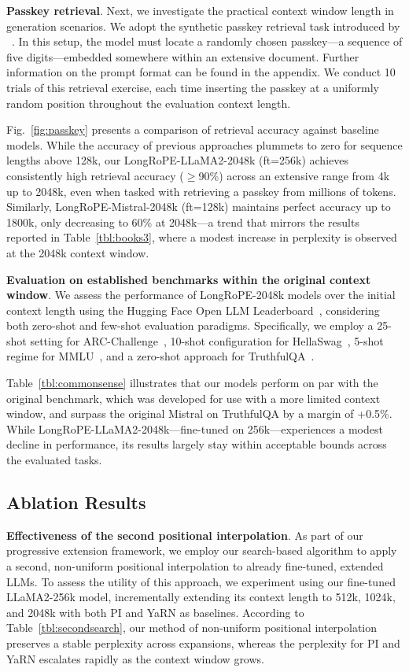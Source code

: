 \textbf{Passkey retrieval}. Next, we investigate the practical context window length in generation scenarios. We adopt the synthetic passkey retrieval task introduced by ~\cite{passkey}. In this setup, the model must locate a randomly chosen passkey—a sequence of five digits—embedded somewhere within an extensive document. Further information on the prompt format can be found in the appendix. We conduct 10 trials of this retrieval exercise, each time inserting the passkey at a uniformly random position throughout the evaluation context length.

Fig.~\ref{fig:passkey} presents a comparison of retrieval accuracy against baseline models. While the accuracy of previous approaches plummets to zero for sequence lengths above 128k, our LongRoPE-LLaMA2-2048k (ft=256k) achieves consistently high retrieval accuracy ($\ge$90\%) across an extensive range from 4k up to 2048k, even when tasked with retrieving a passkey from millions of tokens. Similarly, LongRoPE-Mistral-2048k (ft=128k) maintains perfect accuracy up to 1800k, only decreasing to 60\% at 2048k—a trend that mirrors the results reported in Table~\ref{tbl:books3}, where a modest increase in perplexity is observed at the 2048k context window.

\textbf{Evaluation on established benchmarks within the original context window}. We assess the performance of LongRoPE-2048k models over the initial context length using the Hugging Face Open LLM Leaderboard~\cite{huggingfaceboard}, considering both zero-shot and few-shot evaluation paradigms. Specifically, we employ a 25-shot setting for ARC-Challenge~\cite{allenai:arc}, 10-shot configuration for HellaSwag~\cite{zellers2019hellaswag}, 5-shot regime for MMLU~\cite{mmlu}, and a zero-shot approach for TruthfulQA~\cite{lin2021truthfulqa}.

Table~\ref{tbl:commonsense} illustrates that our models perform on par with the original benchmark, which was developed for use with a more limited context window, and surpass the original Mistral on TruthfulQA by a margin of +0.5\%. While LongRoPE-LLaMA2-2048k—fine-tuned on 256k—experiences a modest decline in performance, its results largely stay within acceptable bounds across the evaluated tasks.

\subsection{Ablation Results}

\textbf{Effectiveness of the second positional interpolation}. As part of our progressive extension framework, we employ our search-based algorithm to apply a second, non-uniform positional interpolation to already fine-tuned, extended LLMs. To assess the utility of this approach, we experiment using our fine-tuned LLaMA2-256k model, incrementally extending its context length to 512k, 1024k, and 2048k with both PI and YaRN as baselines. According to Table~\ref{tbl:secondsearch}, our method of non-uniform positional interpolation preserves a stable perplexity across expansions, whereas the perplexity for PI and YaRN escalates rapidly as the context window grows.

